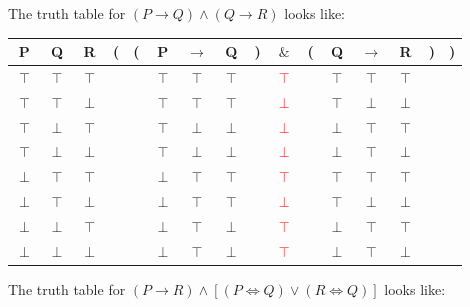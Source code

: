 \documentclass[12pt]{article}
\begin{document}
	The truth table for $(P \rightarrow Q) \land (Q \rightarrow R)$ looks like:
 	
	\begin{tabular}{ c  c  c | c  c  c  c  c  c  c  c  c  c  c  c  c }
		P & Q & R & ( & ( & P & $\rightarrow$ & Q & ) & $\&$ & ( & Q & $\rightarrow$ & R & ) & )\\
		\hline 
		$\top$ & $\top$ & $\top$ &  &  & $\top$ & $\top$ & $\top$ &  & \textcolor{red}{$\top$} &  & $\top$ & $\top$ & $\top$ &  & \\
		$\top$ & $\top$ & $\perp$ &  &  & $\top$ & $\top$ & $\top$ &  & \textcolor{red}{$\perp$} &  & $\top$ & $\perp$ & $\perp$ &  & \\
		$\top$ & $\perp$ & $\top$ &  &  & $\top$ & $\perp$ & $\perp$ &  & \textcolor{red}{$\perp$} &  & $\perp$ & $\top$ & $\top$ &  & \\
		$\top$ & $\perp$ & $\perp$ &  &  & $\top$ & $\perp$ & $\perp$ &  & \textcolor{red}{$\perp$} &  & $\perp$ & $\top$ & $\perp$ &  & \\
		$\perp$ & $\top$ & $\top$ &  &  & $\perp$ & $\top$ & $\top$ &  & \textcolor{red}{$\top$} &  & $\top$ & $\top$ & $\top$ &  & \\
		$\perp$ & $\top$ & $\perp$ &  &  & $\perp$ & $\top$ & $\top$ &  & \textcolor{red}{$\perp$} &  & $\top$ & $\perp$ & $\perp$ &  & \\
		$\perp$ & $\perp$ & $\top$ &  &  & $\perp$ & $\top$ & $\perp$ &  & \textcolor{red}{$\top$} &  & $\perp$ & $\top$ & $\top$ &  & \\
		$\perp$ & $\perp$ & $\perp$ &  &  & $\perp$ & $\top$ & $\perp$ &  & \textcolor{red}{$\top$} &  & $\perp$ & $\top$ & $\perp$ &  & \\
	\end{tabular}

	The truth table for $(P \rightarrow R) \land [ (P \iff Q) \lor (R \iff Q) ]$ looks like: 	
	
\end{document}
